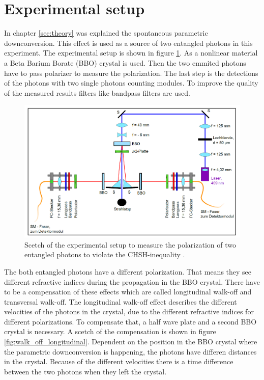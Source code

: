 \section{Experimental setup}\label{sec:setup}
In chapter \ref{sec:theory} was explained the spontaneous parametric downconversion. This effect is used as a source of two entangled photons in this experiment. The experimental setup is shown in figure \ref{fig:setup}. As a nonlinear material a Beta Barium Borate (BBO) crystal is used. Then the two emmited photons have to pass polarizer to measure the polarization.  The last step is the detections of the photons with two single photons counting modules.
To improve the quality of the measured results filters like bandpass filters are used.
\begin{figure}[H]
\centering
\includegraphics[scale=0.2]{figures/setup.PNG}
\caption{Scetch of the experimental setup to measure the polarization of two entangled photons to violate the CHSH-inequality \cite{barz}.   }
\label{fig:setup}
\end{figure}


The both entangled photons have a different polarization. That means they see different refractive indices during the propagation in the BBO crystal. There have to be a compensation of these effects which are called longitudinal walk-off and transversal walk-off.
The longitudinal walk-off effect describes the different velocities of the photons in the crystal, due to the different refractive indices for different polarizations. To compensate that, a half wave plate and a second BBO crystal is necessary. A scetch of the compensation is shown in figure \ref{fig:walk_off_longitudinal}. Dependent on the position in the BBO crystal where the parametric downconversion is happening, the photons have differen distances in the crystal. Because of the different velocities there is a time difference between the two photons when they left the crystal.   


